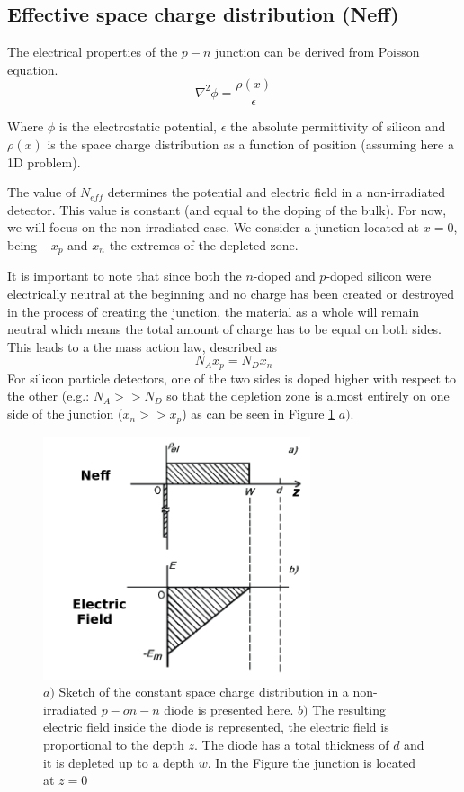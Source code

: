 \subsection{Effective space charge distribution (Neff)} 

The electrical properties of the $p-n$ junction can be derived from Poisson equation. 
\begin{equation}
\nabla^2 \phi = \frac{\rho(x)}{\epsilon} 
\label{eq:poisson}
\end{equation}

Where $\phi$ is the electrostatic potential, $\epsilon$ the absolute
permittivity of silicon and $\rho(x)$ is the space charge distribution as a
function of position (assuming here a 1D problem).

The value of $N_{eff}$ determines the potential and electric field in a
non-irradiated detector. This value is constant (and equal to the doping of the
bulk). For now, we will focus on the non-irradiated case. We consider a junction
located at $x=0$, being $-x_p$ and $x_n$ the extremes of the depleted zone.

It is important to note that since both the $n$-doped and $p$-doped silicon were
electrically neutral at the beginning and no charge has been created or
destroyed in the process of creating the junction, the material as a whole will
remain neutral which means the total amount of charge has to be equal on both
sides. This leads to a the mass action law, described as \[N_A x_p = N_D x_n\] 
For silicon particle detectors, one of the two sides is doped higher with
respect to the other (e.g.: $N_A >> N_D$  so that the depletion zone is almost
entirely on one side of the junction ($x_n >> x_p$) as can be seen in Figure \ref{fig:neffEfield} $a)$. 

\begin{figure}[H]
	\centering
	\includegraphics[width=0.7\textwidth]{Neff_unirrad.png}
	\caption{$a)$ Sketch of the constant space charge distribution in a non-irradiated $p-on-n$ diode is presented here. $b)$ The resulting electric field inside the diode is represented, the electric field is proportional to the depth $z$. The diode has a total thickness of $d$ and it is depleted up to a depth $w$. In the Figure the junction is located at $z = 0$}
	\label{fig:neffEfield}
\end{figure}


